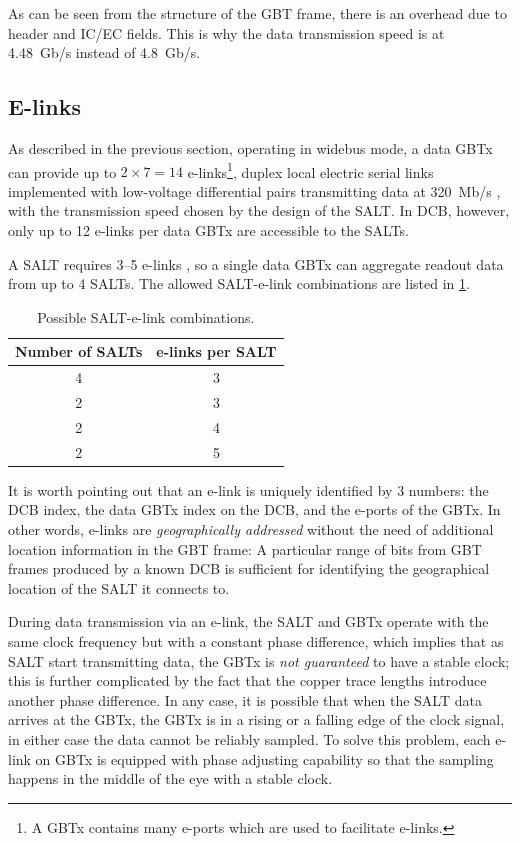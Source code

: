 As can be seen from the structure of the GBT frame, there is an overhead
due to header and IC/EC fields.
This is why the data transmission speed is at 4.48~Gb/s instead of 4.8~Gb/s.


\subsection{E-links}
\label{dcb-elink}

As described in the previous section,
operating in widebus mode,
a data GBTx can provide up to $2 \times 7 = 14$ e-links\footnote{
    A GBTx contains many e-ports which are used to facilitate e-links.
},
duplex local electric serial links implemented with low-voltage differential
pairs transmitting data at 320~Mb/s
\cite{gbtx_manual},
with the transmission speed chosen by the design of the SALT.
In DCB, however, only up to 12 e-links per data GBTx are accessible to the
SALTs.

A SALT requires 3--5 e-links \cite{s22010107},
so a single data GBTx can aggregate readout data from up to 4 SALTs.
The allowed SALT-e-link combinations are listed in \cref{tab:salt-elink}.

\begin{table}[!htb]
    \centering
    \begin{tabular}{ c | c }
        \toprule
        \textbf{Number of SALTs} & \textbf{e-links per SALT} \\
        \midrule
        4  &  3  \\
        2  &  3  \\
        2  &  4  \\
        2  &  5  \\
        \bottomrule
    \end{tabular}

    \caption{Possible SALT-e-link combinations.}
    \label{tab:salt-elink}
\end{table}

It is worth pointing out that an e-link is uniquely identified by 3 numbers:
the DCB index, the data GBTx index on the DCB, and the e-ports of the GBTx.
In other words, e-links are \emph{geographically addressed} without the need
of additional location information in the GBT frame:
A particular range of bits from GBT frames produced by a known DCB is sufficient
for identifying the geographical location of the SALT it connects to.

During data transmission via an e-link, the SALT and GBTx operate with the same
clock frequency but with a constant phase difference,
which implies that as SALT start transmitting data,
the GBTx is \emph{not guaranteed} to have a stable clock;
this is further complicated by the fact that the copper trace lengths introduce
another phase difference.
In any case, it is possible that when the SALT data arrives at the GBTx,
the GBTx is in a rising or a falling edge of the clock signal, in either case
the data cannot be reliably sampled.
To solve this problem, each e-link on GBTx is equipped with phase adjusting
capability so that the sampling happens in the middle of the eye with a stable
clock.


